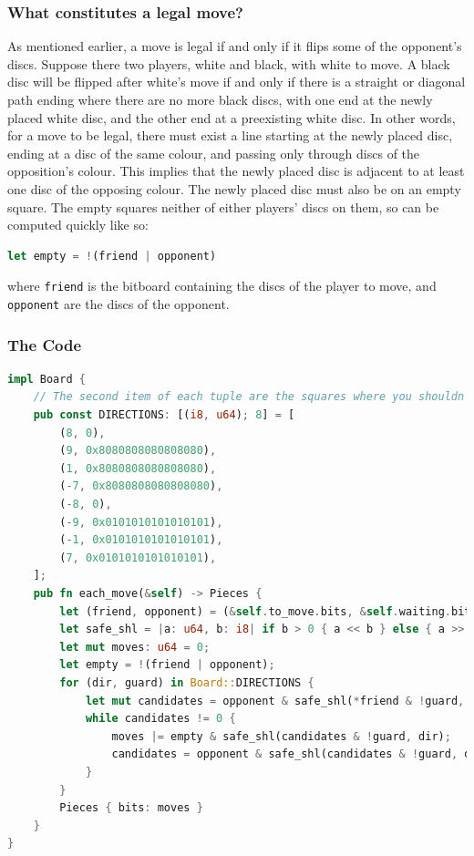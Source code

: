 \documentclass[12pt, a4paper]{report}
\begin{document}
\subsubsection{What constitutes a legal move?}
As mentioned earlier, a move is legal if and only if it flips some of the opponent's discs. Suppose there two players, white and black, with white to move. A black disc will be flipped after white's move
if and only if there is a straight or diagonal path ending where there are no more black discs, with one end at the newly placed white disc, and the other end at a preexisting white disc. In other words, for a move to be legal, 
there must exist a line starting at the newly placed disc, ending at a disc of the same colour, and passing only through discs of the opposition's colour. This implies that the newly placed disc is adjacent to at least one disc 
of the opposing colour. The newly placed disc must also be on an empty square. The empty squares neither of either players' discs on them, so can be computed quickly like so: 
\begin{lstlisting}[language=Rust]
let empty = !(friend | opponent)
\end{lstlisting}
where \texttt{friend} is the bitboard containing the discs of the player to move, and \texttt{opponent} are the discs of the opponent.

\subsubsection{The Code}
\begin{lstlisting}[language=Rust]
impl Board {
    // The second item of each tuple are the squares where you shouldn't shl from for each dir
    pub const DIRECTIONS: [(i8, u64); 8] = [
        (8, 0),
        (9, 0x8080808080808080),
        (1, 0x8080808080808080),
        (-7, 0x8080808080808080),
        (-8, 0),
        (-9, 0x0101010101010101),
        (-1, 0x0101010101010101),
        (7, 0x0101010101010101),
    ];
    pub fn each_move(&self) -> Pieces {
        let (friend, opponent) = (&self.to_move.bits, &self.waiting.bits);
        let safe_shl = |a: u64, b: i8| if b > 0 { a << b } else { a >> (-b) };
        let mut moves: u64 = 0;
        let empty = !(friend | opponent);
        for (dir, guard) in Board::DIRECTIONS {
            let mut candidates = opponent & safe_shl(*friend & !guard, dir);
            while candidates != 0 {
                moves |= empty & safe_shl(candidates & !guard, dir);
                candidates = opponent & safe_shl(candidates & !guard, dir);
            }
        }
        Pieces { bits: moves }
    }
}
\end{lstlisting}
\end{document}
